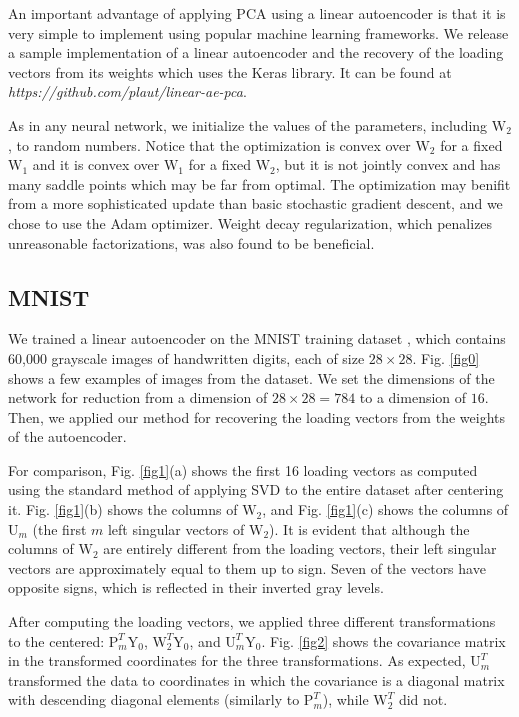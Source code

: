 \documentclass[journal]{IEEEtran}
\begin{document}
An important advantage of applying PCA using a linear autoencoder is that it is very simple to implement using popular machine learning frameworks. We release a sample implementation of a linear autoencoder and the recovery of the loading vectors from its weights which uses the Keras library. It can be found at \emph{https://github.com/plaut/linear-ae-pca}.

As in any neural network, we initialize the values of the parameters, including $\text{W}_2$, to random numbers. Notice that the optimization is convex over $\text{W}_2$ for a fixed $\text{W}_1$ and it is convex over $\text{W}_1$ for a fixed $\text{W}_2$, but it is not jointly convex and has many saddle points which may be far from optimal. The optimization may benifit from a more sophisticated update than basic stochastic gradient descent, and we chose to use the Adam optimizer. Weight decay regularization, which penalizes unreasonable factorizations, was also found to be beneficial.

\subsection{MNIST}
We trained a linear autoencoder on the MNIST training dataset \cite{MNISTdata}, which contains 60,000 grayscale images of handwritten digits, each of size $28 \times 28$. Fig. \ref{fig0} shows a few examples of images from the dataset. We set the dimensions of the network for reduction from a dimension of $28 \times 28=784$ to a dimension of $16$. Then, we applied our method for recovering the loading vectors from the weights of the autoencoder.

For comparison, Fig. \ref{fig1}(a) shows the first 16 loading vectors as computed using the standard method of applying SVD to the entire dataset after centering it. Fig. \ref{fig1}(b) shows the columns of $\text{W}_2$, and Fig. \ref{fig1}(c) shows the columns of $\text{U}_m$ (the first $m$ left singular vectors of $\text{W}_2$). It is evident that although the columns of $\text{W}_2$ are entirely different from the loading vectors, their left singular vectors are approximately equal to them up to sign. Seven of the vectors have opposite signs, which is reflected in their inverted gray levels.

After computing the loading vectors, we applied three different transformations to the centered: $\text{P}_m^T \text{Y}_0$, $\text{W}_2^T \text{Y}_0$, and $\text{U}_m^T \text{Y}_0$. Fig. \ref{fig2} shows the covariance matrix in the transformed coordinates for the three transformations. As expected, $\text{U}_m^T$ transformed the data to coordinates in which the covariance is a diagonal matrix with descending diagonal elements (similarly to $\text{P}_m^T$), while $\text{W}_2^T$ did not.
\end{document}
